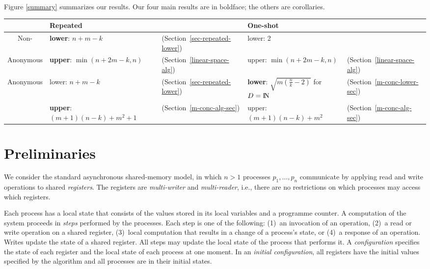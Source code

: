 \documentclass[11pt]{article}
\newcommand{\nat}{{\rm I\!N}}
\newcounter{ind}
\begin{document}
Figure \ref{summary} summarizes our results.
Our four main results are in boldface; the others are corollaries.


\begin{figure*}
\begin{center}
\begin{tabular}{|c|ll|ll|}\hline
			& \hspace*{25mm}Repeated&& \hspace*{28mm}One-shot &\\\hline
\rule{0pt}{3ex}Non-			& {\bf lower}: $n+m-k$ & (Section~\ref{sec-repeated-lower}) 
								& lower: 2 & \cite{DFGR13}\\
\raisebox{-2ex}{\rule{0pt}{5ex}}Anonymous	& {\bf upper}: $\min(n+2m-k,n)$ & (Section~\ref{linear-space-alg})
								& upper:	$\min(n+2m-k,n)$ & (Section~\ref{linear-space-alg})\\\hline
\rule{0pt}{3ex}Anonymous	& lower: $n+m-k$ & (Section~\ref{sec-repeated-lower}) 
								& {\bf lower}: $\sqrt{m(\frac{n}{k}-2)}$ for $D=\nat$ & (Section~\ref{m-conc-lower-sec}) \\
\raisebox{-2ex}{\rule{0pt}{5ex}}			
			& {\bf upper}: $(m+1)(n-k)+m^2+1$ & (Section~\ref{m-conc-alg-sec})
								& upper: $(m+1)(n-k)+m^2$ & (Section~\ref{m-conc-alg-sec})\\\hline
\end{tabular}
\end{center}
\caption{\label{summary}Lower and upper bounds on the number of registers  to solve $m$-obstruction-free $k$-set agreement among $n$ processes, where $1\leq m\leq k<n$ and input values are from domain $D$ (with $|D|>k$).  Our main results appear in boldface; the others are corollaries.}
\end{figure*}




\section{Preliminaries}
\indent


We consider the standard asynchronous shared-memory model, in which $n>1$
processes $p_1,\ldots , p_n$ communicate by applying read and write operations to shared \emph{registers}. The registers
are \emph{multi-writer} and \emph{multi-reader}, i.e., there are no restrictions on 
which processes may access which registers. 



Each process has a local state that consists of the values stored in its
local variables and a programme counter.
A computation of the system proceeds in {\it steps} performed by the processes.  
Each step is one of the
following: (1)~an invocation of an operation, 
(2)~a read or write operation on a shared register, (3)~local
computation that results in a change of a process's state, or
(4)~a response of an operation.
Writes update the state of a shared register.
All steps may update the local state of the process that performs it.
A \emph{configuration} specifies the state of each register and
the local state of each process at one moment. 
In an \emph{initial configuration},
all registers have the initial values specified by the algorithm
and all processes are in their initial states.
\end{document}
